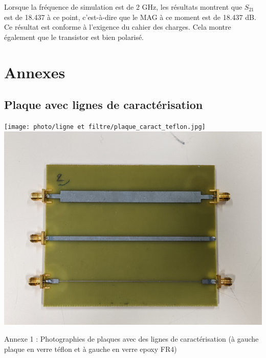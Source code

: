 \documentclass[french]{article}
\begin{document}
Lorsque la fréquence de simulation est de 2 GHz, les résultats montrent que $S_{21}$ est de 18.437 à ce point, c'est-à-dire que le MAG à ce moment est de 18.437 dB. Ce résultat est conforme à l'exigence du cahier des charges. Cela montre également que le transistor est bien polarisé.





\newpage
{}

\newpage

\section*{Annexes}

\subsection*{Plaque avec lignes de caractérisation}
\texttt{[image: photo/ligne et filtre/plaque\_caract\_teflon.jpg]}
\includegraphics[scale=0.07]{photo/ligne et filtre/plaque_caract_epoxy.jpg}
\begin{center}
	Annexe 1 : Photographies de plaques avec des lignes de caractérisation (à gauche plaque en verre téflon et à gauche en verre epoxy FR4)
\end{center}
\end{document}
